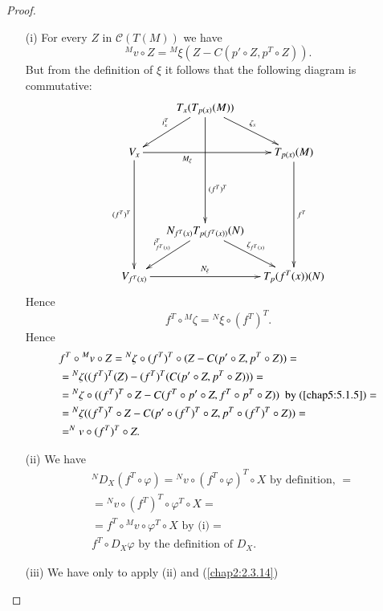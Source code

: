 \begin{proof}
\begin{itemize}
\item[(i)] For every $Z$ in $\mathscr{C}(T(M))$ we have
$$
{}^{M}v\circ Z={}^{M}\xi (Z-C(p'\circ Z,p^{T}\circ Z)).
$$
But from the definition of $\xi$ it follows that the following diagram
is commutative:
\[
\xymatrix@C=.4cm{
 & T_{x}(T_{p(x)}(M))\ar[dl]_{i^{T}_{x}}\ar[dr]^{\zeta_{x}}\ar[ddd]^>>>>>>>>>>>{(f^{T})^{T}} &\\
V_{x}\ar[rr]_<<<<<<<<<<<<<<{M_{\xi}}\ar[ddd]_{(f^{T})^{T}} & & T_{p(x)}(M)\ar[ddd]^{f^{T}}\\
\ar@{}[r] & \ar@{}[r] & \\
 & N_{f^{T}(x)}T_{p(f^{T}(x))}(N)\ar[dl]_{i^{T}_{f^{T}(x)}}\ar[dr]^{\zeta_{f^{T}(x)}}
  &\\
V_{f^{T}(x)}\ar[rr]^-{N_{\xi}} & & T_{p}(f^{T}(x))(N)
}
\]
Hence\pageoriginale
$$
f^{T}\circ {}^{M}\zeta={}^{N}\xi\circ(f^{T})^{T}.
$$
Hence
\begin{align*}
& f^{T}\circ {}^{M}v\circ Z={}^{N}\zeta\circ (f^{T})^{T}\circ
  (Z-C(p'\circ Z, p^{T}\circ Z))=\\
&= {}^{N}\zeta((f^{T})^{T}(Z)-(f^{T})^{T}(C(p'\circ Z,p^{T}\circ
  Z)))=\\
&= {}^{N}\zeta\circ ((f^{T})^{T}\circ Z-C(f^{T}\circ p'\circ
    Z,f^{T}\circ p^{T}\circ Z))\text{ \ by (\ref{chap5:5.1.5})}=\\
&= {}^{N}\zeta((f^{T})^{T}\circ Z-C(p'\circ (f^{T})^{T}\circ Z,
    p^{T}\circ (f^{T})^{T}\circ Z))=\\
&= ^{N}v\circ (f^{T})^{T}\circ Z.
\end{align*}

\item[(ii)] We have
\begin{align*}
& {}^{N}D_{X}(f^{T}\circ\varphi)={}^{N}v\circ
  (f^{T}\circ\varphi)^{T}\circ X\text{ \ by definition, }=\\
& ={}^{N}v\circ (f^{T})^{T}\circ \varphi^{T}\circ X=\\
&= f^{T}\circ {}^{M}v\circ\varphi^{T}\circ X\text{ by (i)} =\\
& f^{T}\circ D_{X}\varphi\text{ \ by the definition of } D_{X}.
\end{align*}

\item[(iii)] We have only to apply (ii) and (\ref{chap2:2.3.14})
\end{itemize}
\end{proof}

